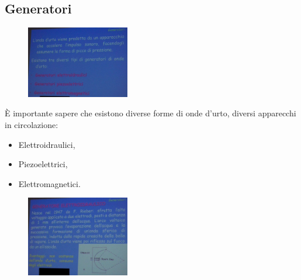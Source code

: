 \subsection{Generatori}

\begin{figure}[!ht]
\centering
\includegraphics[width=0.4\textwidth]{025/image3.jpeg}
\end{figure}

È
importante sapere che esistono diverse forme di onde d'urto, diversi
apparecchi in circolazione:

\begin{itemize}
\item
  Elettroidraulici,
\item
  Piezoelettrici,
\item
  Elettromagnetici.
\end{itemize}

\begin{figure}[!ht]
\centering
\includegraphics[width=0.4\textwidth]{025/image4.jpeg}
\end{figure}

